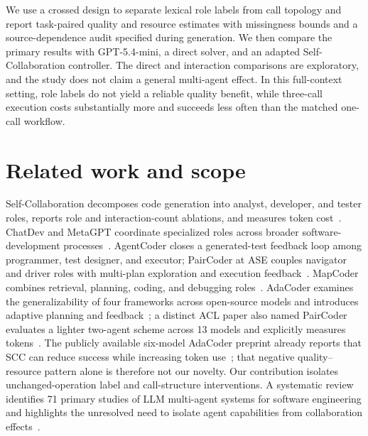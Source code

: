 \documentclass[10pt,letterpaper]{article}
\begin{document}
We use a crossed design to separate lexical role labels from call topology and report task-paired quality and resource estimates with missingness bounds and a source-dependence audit specified during generation. We then compare the primary results with GPT-5.4-mini, a direct solver, and an adapted Self-Collaboration controller. The direct and interaction comparisons are exploratory, and the study does not claim a general multi-agent effect. In this full-context setting, role labels do not yield a reliable quality benefit, while three-call execution costs substantially more and succeeds less often than the matched one-call workflow.

\section*{Related work and scope}
Self-Collaboration decomposes code generation into analyst, developer, and tester roles, reports role and interaction-count ablations, and measures token cost~\cite{dong2023selfcollaboration}. ChatDev and MetaGPT coordinate specialized roles across broader software-development processes~\cite{qian2024chatdev,hong2024metagpt}. AgentCoder closes a generated-test feedback loop among programmer, test designer, and executor; PairCoder at ASE couples navigator and driver roles with multi-plan exploration and execution feedback~\cite{huang2023agentcoder,zhang2024paircoder}. MapCoder combines retrieval, planning, coding, and debugging roles~\cite{islam2024mapcoder}. AdaCoder examines the generalizability of four frameworks across open-source models and introduces adaptive planning and feedback~\cite{zhu2025adacoderpreprint,zhu2026adacoder}; a distinct ACL paper also named PairCoder evaluates a lighter two-agent scheme across 13 models and explicitly measures tokens~\cite{chen2026paircoder}. The publicly available six-model AdaCoder preprint already reports that SCC can reduce success while increasing token use~\cite{zhu2025adacoderpreprint}; that negative quality--resource pattern alone is therefore not our novelty. Our contribution isolates unchanged-operation label and call-structure interventions. A systematic review identifies 71 primary studies of LLM multi-agent systems for software engineering and highlights the unresolved need to isolate agent capabilities from collaboration effects~\cite{he2025lma}.
\end{document}
